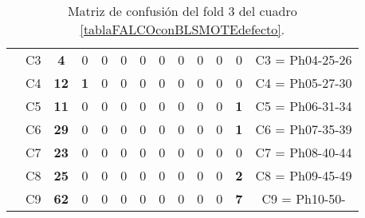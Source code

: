 \begin{table}[H]
{\begin{tabular}{|ccrrrrrrrrrrc|}
\multicolumn{1}{|c|}{}                                      & \multicolumn{1}{c|}{C3} & \multicolumn{1}{c|}{\textbf{4}}  & \multicolumn{1}{c|}{0}  & \multicolumn{1}{c|}{0}  & \multicolumn{1}{c|}{0}  & \multicolumn{1}{c|}{0}  & \multicolumn{1}{c|}{0}  & \multicolumn{1}{c|}{0}  & \multicolumn{1}{c|}{0}  & \multicolumn{1}{c|}{0}  & \multicolumn{1}{c|}{0}  & C3 = Ph04-25-26   \\ \cline{2-13}
\multicolumn{1}{|c|}{}                                      & \multicolumn{1}{c|}{C4} & \multicolumn{1}{c|}{\textbf{12}} & \multicolumn{1}{c|}{\textbf{1}}  & \multicolumn{1}{c|}{0}  & \multicolumn{1}{c|}{0}  & \multicolumn{1}{c|}{0}  & \multicolumn{1}{c|}{0}  & \multicolumn{1}{c|}{0}  & \multicolumn{1}{c|}{0}  & \multicolumn{1}{c|}{0}  & \multicolumn{1}{c|}{0}  & C4 = Ph05-27-30   \\ \cline{2-13}
\multicolumn{1}{|c|}{}                                      & \multicolumn{1}{c|}{C5} & \multicolumn{1}{c|}{\textbf{11}} & \multicolumn{1}{c|}{0}  & \multicolumn{1}{c|}{0}  & \multicolumn{1}{c|}{0}  & \multicolumn{1}{c|}{0}  & \multicolumn{1}{c|}{0}  & \multicolumn{1}{c|}{0}  & \multicolumn{1}{c|}{0}  & \multicolumn{1}{c|}{0}  & \multicolumn{1}{c|}{\textbf{1}}  & C5 = Ph06-31-34   \\ \cline{2-13}
\multicolumn{1}{|c|}{}                                      & \multicolumn{1}{c|}{C6} & \multicolumn{1}{c|}{\textbf{29}} & \multicolumn{1}{c|}{0}  & \multicolumn{1}{c|}{0}  & \multicolumn{1}{c|}{0}  & \multicolumn{1}{c|}{0}  & \multicolumn{1}{c|}{0}  & \multicolumn{1}{c|}{0}  & \multicolumn{1}{c|}{0}  & \multicolumn{1}{c|}{0}  & \multicolumn{1}{c|}{\textbf{1}}  & C6 = Ph07-35-39   \\ \cline{2-13}
\multicolumn{1}{|c|}{}                                      & \multicolumn{1}{c|}{C7} & \multicolumn{1}{c|}{\textbf{23}} & \multicolumn{1}{c|}{0}  & \multicolumn{1}{c|}{0}  & \multicolumn{1}{c|}{0}  & \multicolumn{1}{c|}{0}  & \multicolumn{1}{c|}{0}  & \multicolumn{1}{c|}{0}  & \multicolumn{1}{c|}{0}  & \multicolumn{1}{c|}{0}  & \multicolumn{1}{c|}{0}  & C7 = Ph08-40-44   \\ \cline{2-13}
\multicolumn{1}{|c|}{}                                      & \multicolumn{1}{c|}{C8} & \multicolumn{1}{c|}{\textbf{25}} & \multicolumn{1}{c|}{0}  & \multicolumn{1}{c|}{0}  & \multicolumn{1}{c|}{0}  & \multicolumn{1}{c|}{0}  & \multicolumn{1}{c|}{0}  & \multicolumn{1}{c|}{0}  & \multicolumn{1}{c|}{0}  & \multicolumn{1}{c|}{0}  & \multicolumn{1}{c|}{\textbf{2}}  & C8 = Ph09-45-49   \\ \cline{2-13}
\multicolumn{1}{|c|}{}                                      & \multicolumn{1}{c|}{C9} & \multicolumn{1}{c|}{\textbf{62}} & \multicolumn{1}{c|}{0}  & \multicolumn{1}{c|}{0}  & \multicolumn{1}{c|}{0}  & \multicolumn{1}{c|}{0}  & \multicolumn{1}{c|}{0}  & \multicolumn{1}{c|}{0}  & \multicolumn{1}{c|}{0}  & \multicolumn{1}{c|}{0}  & \multicolumn{1}{c|}{\textbf{7}}  & C9 = Ph10-50-     \\ \hline
\end{tabular}%
}
\caption{Matriz de confusión del fold 3 del cuadro \ref{tablaFALCOconBLSMOTEdefecto}.}
\end{table}

